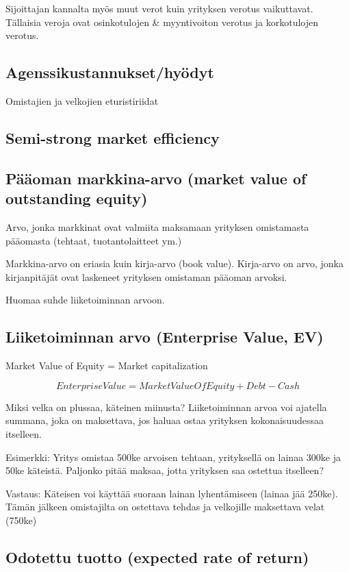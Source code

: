 \documentclass[a4paper]{article}
\begin{document}
Sijoittajan kannalta myös muut verot kuin yrityksen verotus vaikuttavat. Tällaisia veroja ovat osinkotulojen & myyntivoiton verotus ja korkotulojen verotus.

\subsection{Agenssikustannukset/hyödyt}

Omistajien ja velkojien eturistiriidat

\subsection{Semi-strong market efficiency}

\subsection{Pääoman markkina-arvo (market value of outstanding equity)}

Arvo, jonka markkinat ovat valmiita maksamaan yrityksen omistamasta pääomasta (tehtaat, tuotantolaitteet ym.)

Markkina-arvo on eriasia kuin kirja-arvo (book value). Kirja-arvo on arvo, jonka kirjanpitäjät ovat laskeneet yrityksen omistaman pääoman arvoksi.

Huomaa suhde liiketoiminnan arvoon.

\subsection{Liiketoiminnan arvo (Enterprise Value, EV)}

Market Value of Equity = Market capitalization

\[Enterprise Value = Market Value Of Equity + Debt - Cash\]

Miksi velka on plussaa, käteinen miinusta? Liiketoiminnan arvoa voi ajatella summana, joka on maksettava, jos haluaa ostaa yrityksen kokonaisuudessaa itselleen.

Esimerkki: Yritys omistaa 500ke arvoisen tehtaan, yrityksellä on lainaa 300ke ja 50ke käteistä. Paljonko pitää maksaa, jotta yrityksen saa ostettua itselleen?

Vastaus: Käteisen voi käyttää suoraan lainan lyhentämiseen (lainaa jää 250ke). Tämän jälkeen omistajilta on ostettava tehdas ja velkojille maksettava velat (750ke)

\subsection{Odotettu tuotto (expected rate of return)}
\end{document}
